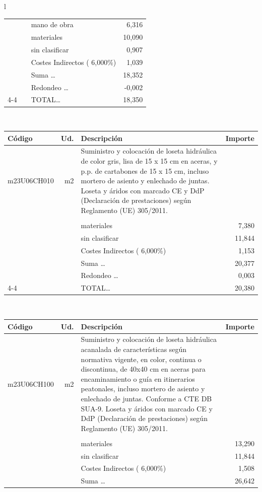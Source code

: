 \documentclass{book}%
\begin{document}
\begin{longtable}{l}
\begin{tabular}{l r p{60mm} r}
&&mano de obra&     6,316\\%
&&materiales&    10,090\\%
&&sin clasificar&     0,907\\%
&&Costes Indirectos (     6,000\%)&     1,039\\%
&&Suma \ldots&    18,352\\%
&&Redondeo \ldots&    {-}0,002\\%
\cline{4-4}%
&&TOTAL\ldots&    18,350\\%
\end{tabular}\\%
\begin{tabular}{l r p{60mm} r}%
Código&Ud.&Descripción&Importe\\%
\hline%
m23U06CH010&m2&Suministro y colocación de loseta hidráulica de color gris, lisa de 15 x 15 cm en aceras, y p.p. de cartabones de 15 x 15 cm, incluso mortero de asiento y enlechado de juntas. Loseta y áridos con marcado CE y DdP (Declaración de prestaciones) según Reglamento (UE) 305/2011.&\\%
&&&\\%
&&materiales&     7,380\\%
&&sin clasificar&    11,844\\%
&&Costes Indirectos (     6,000\%)&     1,153\\%
&&Suma \ldots&    20,377\\%
&&Redondeo \ldots&     0,003\\%
\cline{4-4}%
&&TOTAL\ldots&    20,380\\%
\end{tabular}\\%
\begin{tabular}{l r p{60mm} r}%
Código&Ud.&Descripción&Importe\\%
\hline%
m23U06CH100&m2&Suministro y colocación de loseta hidráulica acanalada de características según normativa vigente, en color, continua o discontinua, de 40x40 cm en aceras para encaminamiento o guía en itinerarios peatonales, incluso mortero de asiento y enlechado de juntas. Conforme a CTE DB SUA{-}9. Loseta y áridos con marcado CE y DdP (Declaración de prestaciones) según Reglamento (UE) 305/2011.&\\%
&&&\\%
&&materiales&    13,290\\%
&&sin clasificar&    11,844\\%
&&Costes Indirectos (     6,000\%)&     1,508\\%
&&Suma \ldots&    26,642\\%

\end{tabular}
\end{longtable}
\end{document}
